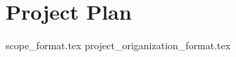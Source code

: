 \documentclass{article}
\begin{document}

\section*{Project Plan}
{scope_format.tex}
{project_origanization_format.tex}



\end{document}
